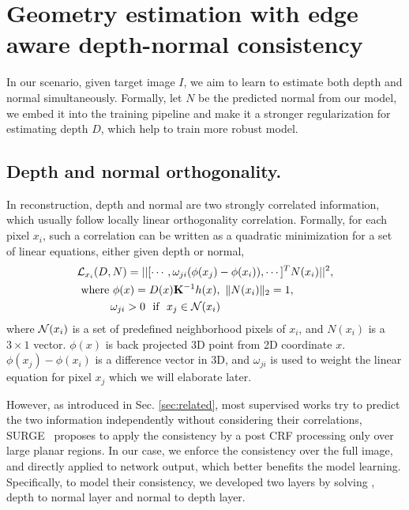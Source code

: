 \section{Geometry estimation with edge aware depth-normal consistency}
\label{sec:approach}
In our scenario, given target image $I$, we aim to learn to estimate both depth and normal simultaneously. Formally, let $N$ be the predicted normal from our model, we embed it into the training pipeline and make it a stronger regularization for estimating depth $D$, which help to train more robust model.

\subsection{Depth and normal orthogonality.}
\label{sub:depth_and_normal_orthogonality_}
In reconstruction, depth and normal are two strongly correlated information, which usually follow locally linear orthogonality correlation. Formally, for each pixel $x_i$, such a correlation can be written as a quadratic minimization for a set of linear equations, either given depth or normal,
\begin{align}
\label{eq:orthognal}
&{\mathcal L}_{x_i}(D, N) = ||[\cdots,\omega_{ji}(\phi(x_j) - \phi(x_i)), \cdots]^T  N(x_i)||^2, \nonumber \\
&~\text{where~} \phi(x) = D(x){\mathbf K}^{-1}h(x), \text{~} \|N(x_i)\|_2 = 1, \nonumber\\
&~\text{~~~~~~~~} \omega_{ji} > 0 \text{~~if~~} x_j \in {\mathcal N}(x_i)
\end{align}
where ${\mathcal N}(x_i)$ is a set of predefined neighborhood pixels of $x_i$, and $N(x_i)$ is a $3 \times 1$ vector. $\phi(x)$ is back projected 3D point from 2D coordinate $x$. $\phi(x_j) - \phi(x_i)$ is a difference vector in 3D, and $\omega_{ji}$ is used to weight the linear equation for pixel $x_j$ which we will elaborate later.

However, as introduced in Sec. \ref{sec:related}, most supervised works try to predict the two information independently without considering their correlations, SURGE~\cite{peng2016depth} proposes to apply the consistency by a post CRF processing only over large planar regions. In our case, we enforce the consistency over the full image, and directly applied to network output, which better benefits the model learning. Specifically, to model their consistency, we developed two layers by solving , \ie depth to normal layer and normal to depth layer. 


